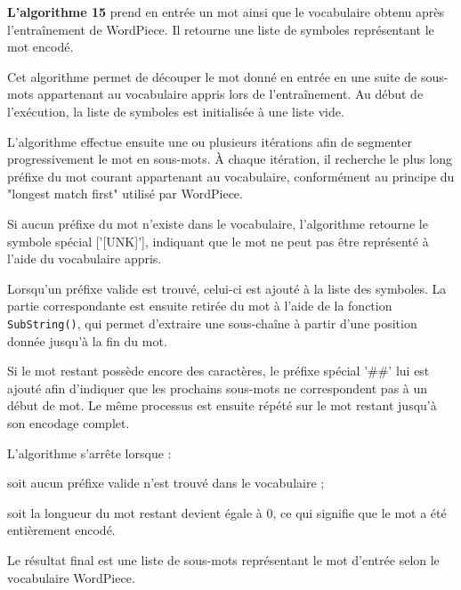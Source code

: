 \documentclass[12pt,a4paper]{report}
\begin{document}
	\vspace{0.5cm}
	
	\textbf{L’algorithme 15} prend en entrée un mot ainsi que le vocabulaire obtenu après l’entraînement de WordPiece. Il retourne une liste de symboles représentant le mot encodé.
	
	Cet algorithme permet de découper le mot donné en entrée en une suite de sous-mots appartenant au vocabulaire appris lors de l’entraînement. Au début de l’exécution, la liste de symboles est initialisée à une liste vide.
	
	L’algorithme effectue ensuite une ou plusieurs itérations afin de segmenter progressivement le mot en sous-mots. À chaque itération, il recherche le plus long préfixe du mot courant appartenant au vocabulaire, conformément au principe du "longest match first" utilisé par WordPiece.
	
	Si aucun préfixe du mot n’existe dans le vocabulaire, l’algorithme retourne le symbole spécial ['[UNK]'], indiquant que le mot ne peut pas être représenté à l’aide du vocabulaire appris.
	
	Lorsqu’un préfixe valide est trouvé, celui-ci est ajouté à la liste des symboles. La partie correspondante est ensuite retirée du mot à l’aide de la fonction \texttt{SubString()}, qui permet d’extraire une sous-chaîne à partir d’une position donnée jusqu’à la fin du mot.
	
	Si le mot restant possède encore des caractères, le préfixe spécial '\#\#' lui est ajouté afin d’indiquer que les prochains sous-mots ne correspondent pas à un début de mot. Le même processus est ensuite répété sur le mot restant jusqu’à son encodage complet.
	
	L’algorithme s’arrête lorsque :
	
	\begin{itemizeFB}
		\item soit aucun préfixe valide n’est trouvé dans le vocabulaire ;
		\item soit la longueur du mot restant devient égale à 0, ce qui signifie que le mot a été entièrement encodé.
	\end{itemizeFB}
	
	Le résultat final est une liste de sous-mots représentant le mot d’entrée selon le vocabulaire WordPiece.
		
\end{document}

